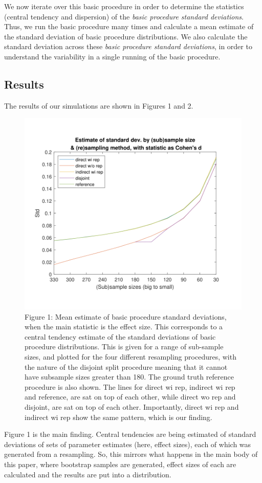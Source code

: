\documentclass[
]{article}
\begin{document}
We now iterate over this basic procedure in order to determine the
statistics (central tendency and dispersion) of the \emph{basic
procedure standard deviations}. Thus, we run the basic procedure many
times and calculate a mean estimate of the standard deviation of basic
procedure distributions. We also calculate the standard deviation across
these \emph{basic procedure standard deviations}, in order to understand
the variability in a single running of the basic procedure.

\subsection{Results}\label{results}

The results of our simulations are shown in Figures 1 and 2.

\begin{figure}
\includegraphics[width=0.7\linewidth]{figure1_sml} \caption{Figure 1: Mean estimate of basic procedure standard deviations, when the main statistic is the effect size. This corresponds to a central tendency estimate of the standard deviations of basic procedure distributions. This is given for a range of sub-sample sizes, and plotted for the four different resampling procedures, with the nature of the disjoint split procedure meaning that it cannot have subsample sizes greater than 180. The ground truth reference procedure is also shown. The lines for direct wi rep, indirect wi rep and reference, are sat on top of each other, while direct wo rep and disjoint, are sat on top of each other. Importantly, direct wi rep and indirect wi rep show the same pattern, which is our finding.}\label{fig:FigureSDs}
\end{figure}

Figure 1 is the main finding. Central tendencies are being estimated of
standard deviations of sets of parameter estimates (here, effect sizes),
each of which was generated from a resampling. So, this mirrors what
happens in the main body of this paper, where bootstrap samples are
generated, effect sizes of each are calculated and the results are put
into a distribution.
\end{document}
